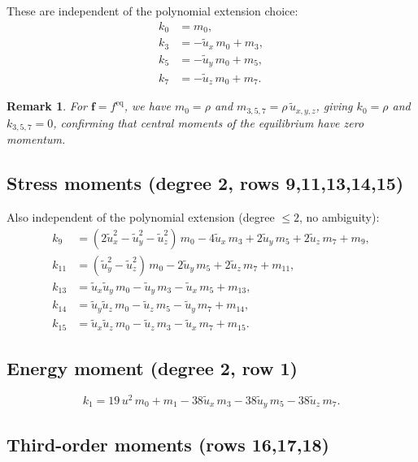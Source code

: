 \documentclass[11pt,a4paper]{article}
\newtheorem{remark}{Remark}[section]
\newcommand{\vect}[1]{\bm{#1}}
\newcommand{\feq}{f^{\mathrm{eq}}}
\newcommand{\tu}{\tilde{u}}
\begin{document}
These are independent of the polynomial extension choice:
\begin{align}
  k_0 &= m_0, \label{eq:k0}\\
  k_3 &= -\tu_x\,m_0 + m_3, \label{eq:k3}\\
  k_5 &= -\tu_y\,m_0 + m_5, \label{eq:k5}\\
  k_7 &= -\tu_z\,m_0 + m_7. \label{eq:k7}
\end{align}

\begin{remark}
For $\vect{f} = \feq$, we have $m_0 = \rho$ and $m_{3,5,7} = \rho\,\tu_{x,y,z}$, giving $k_0 = \rho$ and $k_{3,5,7} = 0$, confirming that central moments of the equilibrium have zero momentum.
\end{remark}

\subsection{Stress moments (degree 2, rows 9,11,13,14,15)}

Also independent of the polynomial extension (degree $\leq 2$, no ambiguity):
\begin{align}
  k_9  &= (2\tu_x^2 - \tu_y^2 - \tu_z^2)\,m_0 - 4\tu_x\,m_3 + 2\tu_y\,m_5 + 2\tu_z\,m_7 + m_9, \label{eq:k9}\\
  k_{11} &= (\tu_y^2 - \tu_z^2)\,m_0 - 2\tu_y\,m_5 + 2\tu_z\,m_7 + m_{11}, \label{eq:k11}\\
  k_{13} &= \tu_x\tu_y\,m_0 - \tu_y\,m_3 - \tu_x\,m_5 + m_{13}, \label{eq:k13}\\
  k_{14} &= \tu_y\tu_z\,m_0 - \tu_z\,m_5 - \tu_y\,m_7 + m_{14}, \label{eq:k14}\\
  k_{15} &= \tu_x\tu_z\,m_0 - \tu_z\,m_3 - \tu_x\,m_7 + m_{15}. \label{eq:k15}
\end{align}

\subsection{Energy moment (degree 2, row 1)}

\begin{equation}\label{eq:k1}
  k_1 = 19\,u^2\,m_0 + m_1 - 38\tu_x\,m_3 - 38\tu_y\,m_5 - 38\tu_z\,m_7.
\end{equation}

\subsection{Third-order moments (rows 16,17,18)}
\end{document}
